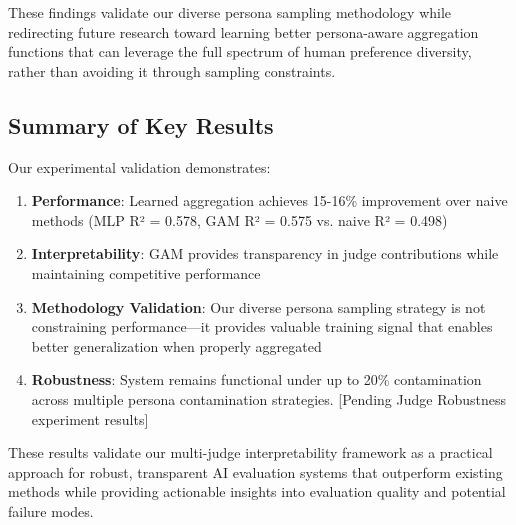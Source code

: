 These findings validate our diverse persona sampling methodology while redirecting future research toward learning better persona-aware aggregation functions that can leverage the full spectrum of human preference diversity, rather than avoiding it through sampling constraints.

\subsection{Summary of Key Results}

Our experimental validation demonstrates:

\begin{enumerate}
    \item \textbf{Performance}: Learned aggregation achieves 15-16\% improvement over naive methods (MLP R² = 0.578, GAM R² = 0.575 vs. naive R² = 0.498)
    \item \textbf{Interpretability}: GAM provides transparency in judge contributions while maintaining competitive performance
    \item \textbf{Methodology Validation}: Our diverse persona sampling strategy is not constraining performance—it provides valuable training signal that enables better generalization when properly aggregated
    \item \textbf{Robustness}: System remains functional under up to 20\% contamination across multiple persona contamination strategies. [Pending Judge Robustness experiment results]
\end{enumerate}

These results validate our multi-judge interpretability framework as a practical approach for robust, transparent AI evaluation systems that outperform existing methods while providing actionable insights into evaluation quality and potential failure modes.
